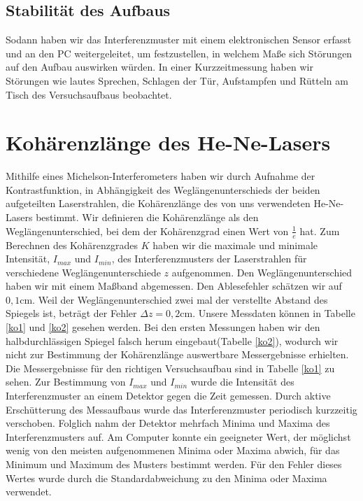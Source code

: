 \documentclass[12pt,a4paper]{article}
\begin{document}
\subsection{Stabilität des Aufbaus}

Sodann haben wir das Interferenzmuster mit einem elektronischen Sensor erfasst und an den PC weitergeleitet, um festzustellen, in welchem Maße sich Störungen auf den Aufbau auswirken würden. In einer Kurzzeitmessung haben wir Störungen wie lautes Sprechen, Schlagen der Tür, Aufstampfen und Rütteln am Tisch des Versuchsaufbaus beobachtet.


\section{Kohärenzlänge des He-Ne-Lasers}

Mithilfe eines Michelson-Interferometers haben wir durch Aufnahme der Kontrastfunktion, in Abhängigkeit des Weglängenunterschieds der beiden aufgeteilten Laserstrahlen, die Kohärenzlänge des von uns verwendeten He-Ne-Lasers bestimmt. Wir definieren die Kohärenzlänge als den Weglängenunterschied, bei dem der Kohärenzgrad einen Wert von $\frac{1}{e}$ hat. Zum Berechnen des Kohärenzgrades $K$ haben wir die maximale und minimale Intensität, $I_{max}$ und $I_{min}$, des Interferenzmusters der Laserstrahlen für verschiedene Weglängenunterschiede $z$ aufgenommen. Den Weglängenunterschied haben wir mit einem Maßband abgemessen. Den Ablesefehler schätzen wir auf $0,1$cm. Weil der Weglängenunterschied zwei mal der verstellte Abstand des Spiegels ist, beträgt der Fehler $\Delta z = 0,2$cm. Unsere Messdaten können in Tabelle \ref{ko1} und \ref{ko2} gesehen werden. Bei den ersten Messungen haben wir den halbdurchlässigen Spiegel falsch herum eingebaut(Tabelle \ref{ko2}), wodurch wir nicht zur Bestimmung der Kohärenzlänge auswertbare Messergebnisse erhielten. Die Messergebnisse für den richtigen Versuchsaufbau sind in Tabelle \ref{ko1} zu sehen. Zur Bestimmung von $I_{max}$ und $I_{min}$ wurde die Intensität des Interferenzmuster an einem Detektor gegen die Zeit gemessen. Durch aktive Erschütterung des Messaufbaus wurde das Interferenzmuster periodisch kurzzeitig verschoben. Folglich nahm der Detektor mehrfach Minima und Maxima des Interferenzmusters auf. Am Computer konnte ein geeigneter Wert, der möglichst wenig von den meisten aufgenommenen Minima oder Maxima abwich, für das Minimum und Maximum des Musters bestimmt werden. Für den Fehler dieses Wertes wurde durch die Standardabweichung zu den Minima oder Maxima verwendet.
\end{document}
